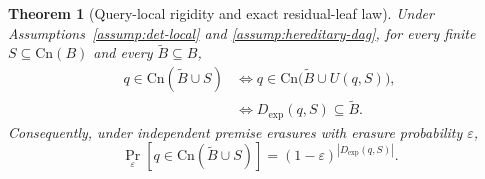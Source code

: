 \documentclass[journal]{IEEEtran}
\newcommand{\Cn}{\text{Cn}}
\newtheorem{theorem}{Theorem}[section]
\numberwithin{equation}{section}
\begin{document}
\begin{theorem}[Query-local rigidity and exact residual-leaf law]
\label{thm:exact-residual-law}
Under Assumptions~\ref{assump:det-local} and
\ref{assump:hereditary-dag}, for every finite
\(S\subseteq\Cn(B)\) and every \(\widetilde B\subseteq B\),
\begin{align}
  q\in\Cn(\widetilde B\cup S)
  &\Longleftrightarrow
  q\in\Cn\bigl(\widetilde B\cup U(q,S)\bigr),
\label{eq:query-local-rigidity}\\
  &\Longleftrightarrow
  D_{\mathrm{exp}}(q,S)\subseteq\widetilde B.
\label{eq:exact-residual-event}
\end{align}
Consequently, under independent premise erasures with erasure probability
\(\varepsilon\),
\begin{equation}
  \Pr_{\varepsilon}
  \left[
    q\in\Cn(\widetilde B\cup S)
  \right]
  =
  (1-\varepsilon)^{|D_{\mathrm{exp}}(q,S)|}.
\label{eq:exact-residual-probability}
\end{equation}
\end{theorem}
\end{document}
